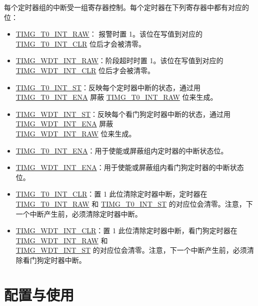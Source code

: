 \documentclass[main\_\_CN.tex]{subfiles}
\begin{document}
每个定时器组的中断受一组寄存器控制。每个定时器在下列寄存器中都有对应的位：

\begin{itemize}
\item \hyperref[fielddesc:TIMGT0INTRAW]{TIMG\_T0\_INT\_RAW}：
报警时置 1。该位在写值到对应的 \hyperref[fielddesc:TIMGT0INTCLR]{TIMG\_T0\_INT\_CLR} 位后才会被清零。
\item \hyperref[fielddesc:TIMGWDTINTRAW]{TIMG\_WDT\_INT\_RAW}：阶段超时时置 1。该位在写值到对应的 \hyperref[fielddesc:TIMGWDTINTCLR]{TIMG\_WDT\_INT\_CLR} 位后才会被清零。
\item \hyperref[fielddesc:TIMGT0INTST]{TIMG\_T0\_INT\_ST}：反映每个定时器中断的状态，通过用 \hyperref[fielddesc:TIMGT0INTENA]{TIMG\_T0\_INT\_ENA} 屏蔽 \hyperref[fielddesc:TIMGT0INTRAW]{TIMG\_T0\_INT\_RAW} 位来生成。
\item \hyperref[fielddesc:TIMGWDTINTST]{TIMG\_WDT\_INT\_ST}：反映每个看门狗定时器中断的状态，通过用 \hyperref[fielddesc:TIMGWDTINTENA]{TIMG\_WDT\_INT\_ENA} 屏蔽 \\\hyperref[fielddesc:TIMGWDTINTRAW]{TIMG\_WDT\_INT\_RAW} 位来生成。
\item \hyperref[fielddesc:TIMGT0INTENA]{TIMG\_T0\_INT\_ENA}：用于使能或屏蔽组内定时器的中断状态位。
\item \hyperref[fielddesc:TIMGWDTINTENA]{TIMG\_WDT\_INT\_ENA}：用于使能或屏蔽组内看门狗定时器的中断状态位。
\item \hyperref[fielddesc:TIMGT0INTCLR]{TIMG\_T0\_INT\_CLR}：置 1 此位清除定时器中断，定时器在 \hyperref[fielddesc:TIMGT0INTRAW]{TIMG\_T0\_INT\_RAW} 和 \hyperref[fielddesc:TIMGT0INTST]{TIMG\_T0\_INT\_ST} 的对应位会清零。注意，下一个中断产生前，必须清除定时器中断。
\item \hyperref[fielddesc:TIMGWDTINTCLR]{TIMG\_WDT\_INT\_CLR}：置 1 此位清除定时器中断，看门狗定时器在 \hyperref[fielddesc:TIMGWDTINTRAW]{TIMG\_WDT\_INT\_RAW} 和\\\hyperref[fielddesc:TIMGWDTINTST]{TIMG\_WDT\_INT\_ST} 的对应位会清零。注意，下一个中断产生前，必须清除看门狗定时器中断。
\end{itemize}

\section{配置与使用}
\end{document}
